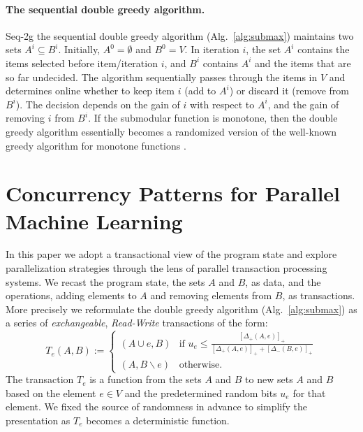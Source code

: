 \documentclass{article} %
\newcommand{\seqalg}{Seq-2g}
\newcommand{\algref}[1]{Alg.~\ref{#1}}
\newcommand{\hinge}[1]{\left[  #1 \right]_+}
\newcommand{\union}{\cup}
\begin{document}
\paragraph{The sequential double greedy algorithm.}
\seqalg{} the sequential double greedy algorithm (\algref{alg:submax}) maintains two sets $A^i \subseteq B^i$. Initially, $A^0 = \emptyset$ and $B^0 = V$. In iteration $i$, the set $A^i$ contains the items selected before item/iteration $i$, and $B^i$ contains $A^i$ and the items that are so far undecided. The algorithm sequentially passes through the items in $V$ and determines online whether to keep item $i$ (add to $A^i$) or discard it (remove from $B^i$). The decision depends on the gain of $i$ with respect to $A^i$, and the gain of removing $i$ from $B^i$.
If the submodular function is monotone, then the double greedy algorithm essentially becomes a randomized version of the well-known greedy algorithm for monotone functions \citep{nemhauser1978}.









\section{Concurrency Patterns for Parallel Machine Learning \label{sec:concurrencycontrol}}

In this paper we adopt a transactional view of the program state and explore parallelization strategies through the lens of parallel transaction processing systems.
We recast the program state, the sets $A$ and $B$, as data, and the operations, adding elements to $A$ and removing elements from $B$, as transactions.
More precisely we reformulate the double greedy algorithm (\algref{alg:submax}) as a series of \emph{exchangeable}, \emph{Read-Write} transactions of the form:
\begin{equation}
T_e(A,B) :=
\begin{cases}
   (A \union e, B) & \text{if } u_e \leq \frac{\hinge{\Delta_+(A,e)}}{ \hinge{\Delta_+(A,e)} + \hinge{\Delta_-(B,e)}}  \\
   (A, B \backslash e) & \text{otherwise. }
  \end{cases}
  \label{eqn:greedytransaction}
\end{equation}
The transaction $T_e$ is a function from the sets $A$ and $B$ to new sets $A$ and $B$ based on the element $e \in V$ and the predetermined random bits $u_e$ for that element.
We fixed the source of randomness in advance to simplify the presentation as $T_e$ becomes a deterministic function.
\end{document}
